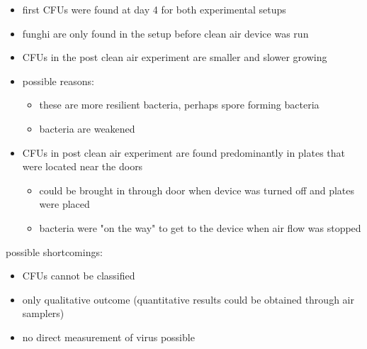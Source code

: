 \documentclass[hyperref]{labbook}
\begin{document}
\begin{itemize}
\item first CFUs were found at day 4 for both experimental setups
\item funghi are only found in the setup before clean air device was run
\item CFUs in the post clean air experiment are smaller and slower growing
\item possible reasons:
\begin{itemize}
\item these are more resilient bacteria, perhaps spore forming bacteria
\item bacteria are weakened
\end{itemize}
\item CFUs in post clean air experiment are found predominantly in plates that were located near the doors
\begin{itemize}
\item could be brought in through door when device was turned off and plates were placed
\item bacteria were "on the way" to get to the device when air flow was stopped
\end{itemize}
\end{itemize}
possible shortcomings:
\begin{itemize}
\item CFUs cannot be classified
\item only qualitative outcome (quantitative results could be obtained through air samplers)
\item no direct measurement of virus possible
\end{itemize}
\end{document}

